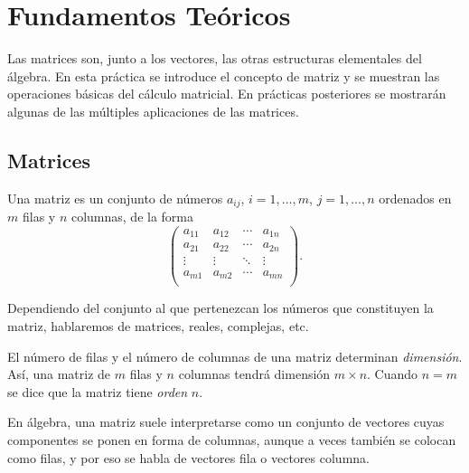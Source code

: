 \documentclass[a4paper]{article}
\begin{document}

\bigskip
\section*{Fundamentos Teóricos}
Las matrices son, junto a los vectores, las otras estructuras elementales del álgebra.
En esta práctica se introduce el concepto de matriz y se muestran las operaciones básicas 
del cálculo matricial. En prácticas posteriores se mostrarán algunas de las múltiples
aplicaciones de las matrices. 

\subsection*{Matrices}
Una matriz es un conjunto de números $a_{ij}$, $i=1,\ldots,m$, $j=1,\ldots,n$ ordenados 
en $m$ filas y $n$ columnas, de la forma
\[
\left(
\begin{array}{cccc}
 a_{11} & a_{12} & \cdots & a_{1n} \\
 a_{21} & a_{22} & \cdots & a_{2n} \\
 \vdots & \vdots & \ddots & \vdots \\
 a_{m1} & a_{m2} & \cdots & a_{mn} \\
\end{array}
\right).
\]

Dependiendo del conjunto al que pertenezcan los números que constituyen la matriz, hablaremos
de matrices, reales, complejas, etc.

El número de filas y el número de columnas de una matriz determinan \emph{dimensión}. Así, una matriz de $m$ filas y $n$ columnas tendrá dimensión $m\times n$. Cuando $n=m$ se dice que la matriz tiene \emph{orden} $n$.

En álgebra, una matriz suele interpretarse como un conjunto de vectores cuyas componentes se ponen en forma de columnas, aunque a veces también se colocan como filas, y por eso se habla de vectores fila o vectores columna.
\end{document}

